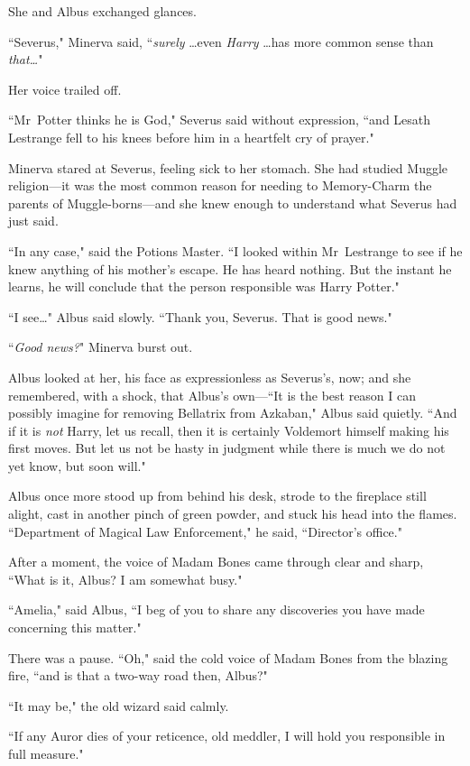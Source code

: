 She and Albus exchanged glances.

``Severus," Minerva said, ``\emph{surely} {\ldots}even \emph{Harry} {\ldots}has more common sense than \emph{that{\ldots}}"

Her voice trailed off.

``Mr~Potter thinks he is God," Severus said without expression, ``and Lesath Lestrange fell to his knees before him in a heartfelt cry of prayer."

Minerva stared at Severus, feeling sick to her stomach. She had studied Muggle religion—it was the most common reason for needing to Memory-Charm the parents of Muggle-borns—and she knew enough to understand what Severus had just said.

``In any case," said the Potions Master. ``I looked within Mr~Lestrange to see if he knew anything of his mother's escape. He has heard nothing. But the instant he learns, he will conclude that the person responsible was Harry Potter."

``I see{\ldots}" Albus said slowly. ``Thank you, Severus. That is good news."

``\emph{Good news?}" Minerva burst out.

Albus looked at her, his face as expressionless as Severus's, now; and she remembered, with a shock, that Albus's own—``It is the best reason I can possibly imagine for removing Bellatrix from Azkaban," Albus said quietly. ``And if it is \emph{not} Harry, let us recall, then it is certainly Voldemort himself making his first moves. But let us not be hasty in judgment while there is much we do not yet know, but soon will."

Albus once more stood up from behind his desk, strode to the fireplace still alight, cast in another pinch of green powder, and stuck his head into the flames. ``Department of Magical Law Enforcement," he said, ``Director's office."

After a moment, the voice of Madam Bones came through clear and sharp, ``What is it, Albus? I am somewhat busy."

``Amelia," said Albus, ``I beg of you to share any discoveries you have made concerning this matter."

There was a pause. ``Oh," said the cold voice of Madam Bones from the blazing fire, ``and is that a two-way road then, Albus?"

``It may be," the old wizard said calmly.

``If any Auror dies of your reticence, old meddler, I will hold you responsible in full measure."

